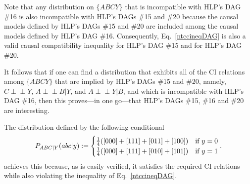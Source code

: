 \documentclass[aps,english,10pt,superscriptaddress,onecolumn,twoside,longbibliography,pra,floatfix,fleqn,nofootinbib]{revtex4-1}%
\theoremstyle{definition}
\newcommand{\indep}{\perp\!\!\!\!\perp} %
\newcommand{\eql}{=}
\DeclarePairedDelimiter{\parenths}{\lparen}{\rparen}
\begin{document}
Note that any distribution on $\{ ABCY\}$ that is incompatible with HLP's DAG \#16 is also incompatible with HLP's DAGs \#15 and \#20 because the causal models defined by HLP's DAGs \#15 and \#20 are included among the causal models defined by HLP's DAG \#16.  Consequently, Eq.~\eqref{ntccineqDAG} is also a valid causal compatibility inequality for HLP's DAG \#15 and for HLP's DAG \#20.

It follows that if one can find a distribution that exhibits all of the CI relations among $\{ ABCY\}$ that are implied by HLP's DAGs \#15 and \#20, namely, $C\indep Y$, $A\indep B|Y$, and $A\indep Y|B$, and which is incompatible with HLP's DAG \#16, then this proves---in one go---that HLP's DAGs \#15, \#16 and \#20 are interesting.

The distribution defined by the following conditional
\begin{align}\label{eq:allcirespectingdistro}
  P_{A B C|Y}(a b c| y):=
  \begin{cases}\frac{1}{4}\parenths{[000]+[111]+[011]+[100]}&\text{if }  y\eql 0 \\ \frac{1}{4}\parenths{[000]+[111]+[010]+[101]}&\text{if }  y\eql 1\end{cases}.
\end{align}
achieves this because, as is easily verified, it satisfies the required CI relations while also violating the inequality of Eq.~\eqref{ntccineqDAG}.


\color{black}
\end{document}
